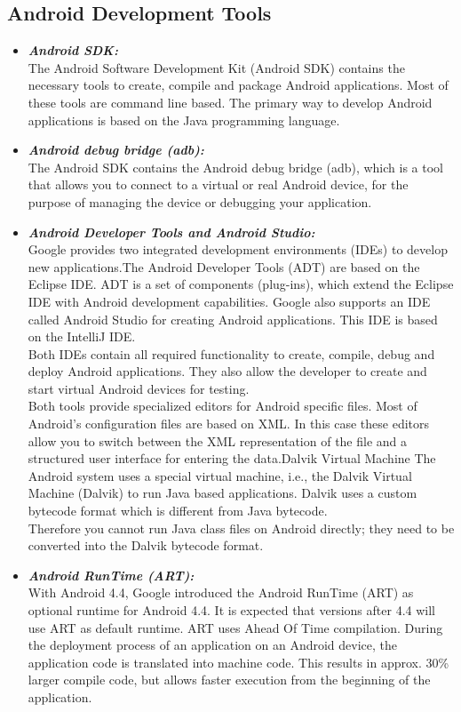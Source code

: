 \subsection{Android Development Tools}
\begin{itemize}
\item \textbf{\emph{Android SDK:}}\\
The Android Software Development Kit (Android SDK) contains the
necessary tools to create, compile and package Android applications. Most
of these tools are command line based. The primary way to develop
Android applications is based on the Java programming language.
\item \textbf{\emph{Android debug bridge (adb):}}\\
The Android SDK contains the Android debug bridge (adb), which is a
tool that allows you to connect to a virtual or real Android device, for the
purpose of managing the device or debugging your application.
\item \textbf{\emph{Android Developer Tools and Android Studio:}}\\
Google provides two integrated development environments (IDEs) to
develop new applications.The Android Developer Tools (ADT) are based on the Eclipse IDE. ADT
is a set of components (plug-ins), which extend the Eclipse IDE with
Android development capabilities.
Google also supports an IDE called Android Studio for creating Android
applications. This IDE is based on the IntelliJ IDE.\\
Both IDEs contain all required functionality to create, compile, debug and
deploy Android applications. They also allow the developer to create and
start virtual Android devices for testing.\\
Both tools provide specialized editors for Android specific files. Most of
Android's configuration files are based on XML. In this case these editors
allow you to switch between the XML representation of the file and a
structured user interface for entering the data.Dalvik Virtual Machine
The Android system uses a special virtual machine, i.e., the Dalvik Virtual
Machine (Dalvik) to run Java based applications. Dalvik uses a custom
bytecode format which is different from Java bytecode.
\\
Therefore you cannot run Java class files on Android directly; they need to
be converted into the Dalvik bytecode format.
\item \textbf{\emph{Android RunTime (ART):}}\\
With Android 4.4, Google introduced the Android RunTime (ART) as
optional runtime for Android 4.4. It is expected that versions after 4.4 will
use ART as default runtime. ART uses Ahead Of Time compilation. During the deployment process of
an application on an Android device, the application code is translated into
machine code. This results in approx. 30\% larger compile code, but allows
faster execution from the beginning of the application.

\end{itemize}

